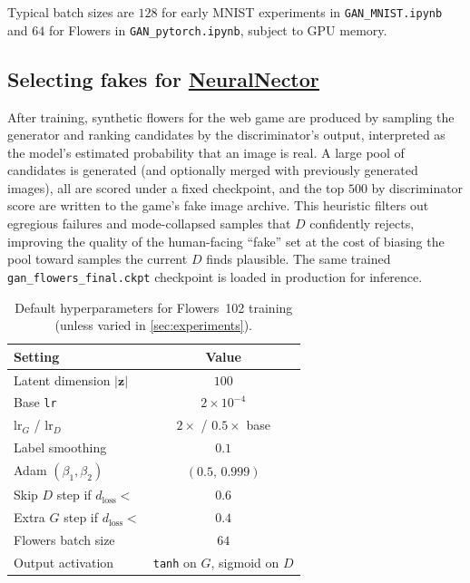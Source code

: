 \documentclass{article}
\theoremstyle{plain}
\theoremstyle{definition}
\theoremstyle{remark}
\begin{document}
Typical batch sizes are $128$ for early MNIST experiments in \texttt{GAN\_MNIST.ipynb} and $64$ for Flowers in \texttt{GAN\_pytorch.ipynb}, subject to GPU memory.

\subsection{Selecting fakes for \underline{\href{https://neuralnector.com}{NeuralNector}}}

After training, synthetic flowers for the web game are produced by sampling the generator and ranking candidates by the discriminator's output, interpreted as the model's estimated probability that an image is real. A large pool of candidates is generated (and optionally merged with previously generated images), all are scored under a fixed checkpoint, and the top $500$ by discriminator score are written to the game's fake image archive. This heuristic filters out egregious failures and mode-collapsed samples that $D$ confidently rejects, improving the quality of the human-facing ``fake'' set at the cost of biasing the pool toward samples the current $D$ finds plausible. The same trained \texttt{gan\_flowers\_final.ckpt} checkpoint is loaded in production for inference.

\begin{table}[t]
\caption{Default hyperparameters for Flowers~102 training (unless varied in \cref{sec:experiments}).}
\label{tab:hparams}
\vskip 0.1in
\begin{center}
\begin{small}
\begin{sc}
\begin{tabular}{lc}
\toprule
Setting & Value \\
\midrule
Latent dimension $|\mathbf{z}|$ & $100$ \\
Base \texttt{lr} & $2\times 10^{-4}$ \\
$\mathrm{lr}_G$ / $\mathrm{lr}_D$ & $2\times$ / $0.5\times$ base \\
Label smoothing & $0.1$ \\
Adam $(\beta_1,\beta_2)$ & $(0.5,\,0.999)$ \\
Skip $D$ step if $d_{\mathrm{loss}}<$ & $0.6$ \\
Extra $G$ step if $d_{\mathrm{loss}}<$ & $0.4$ \\
Flowers batch size & $64$ \\
Output activation & \texttt{tanh} on $G$, sigmoid on $D$ \\
\bottomrule
\end{tabular}
\end{sc}
\end{small}
\end{center}
\vskip -0.1in
\end{table}
\end{document}
